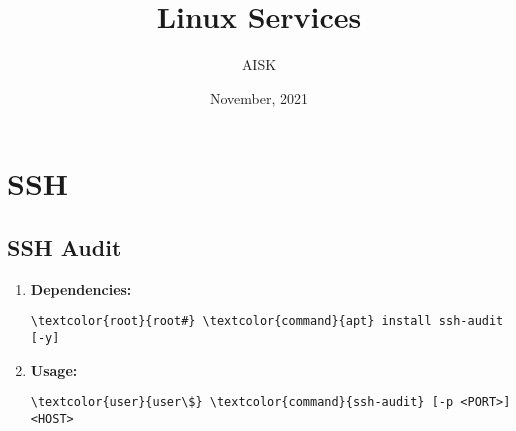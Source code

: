 \documentclass[10pt, a4paper, onecolumn, openany]{book} %
\title{\textbf{Linux Services}}
\author{AISK}
\date{November, 2021}
\begin{document}
\maketitle
\tableofcontents





\chapter{SSH}
\section{SSH Audit}
\begin{enumerate}
    \item \textbf{Dependencies:}
\begin{Verbatim}[commandchars=\\\{\}]
\textcolor{root}{root#} \textcolor{command}{apt} install ssh-audit [-y]
\end{Verbatim}   
    \item \textbf{Usage:}
\begin{Verbatim}[commandchars=\\\{\}]
\textcolor{user}{user\$} \textcolor{command}{ssh-audit} [-p <PORT>] <HOST>
\end{Verbatim}       
\end{enumerate}
\end{document}
